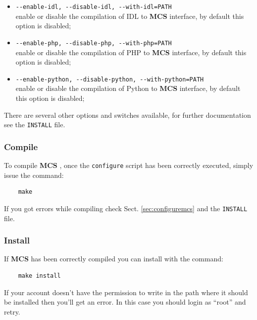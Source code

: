 \documentclass[12pt,titlepage]{article}
\newcommand{\mcs}{\textbf{MCS} }
\newcommand{\myro}{\textbf{MyRO} }
\newcommand{\dif}{\textbf{DIF} }
\begin{document}
\begin{itemize}
\item \verb|--enable-idl, --disable-idl, --with-idl=PATH| \\
  enable or disable the compilation of IDL to \mcs interface, by default
  this option is disabled;

\item \verb|--enable-php, --disable-php, --with-php=PATH| \\
  enable or disable the compilation of PHP to \mcs interface, by default
  this option is disabled;

\item \verb|--enable-python, --disable-python, --with-python=PATH| \\
  enable or disable the compilation of Python to \mcs interface, by default
  this option is disabled;
\end{itemize}

\bigskip

%

\noindent
There are several other options and switches available, for further
documentation see the \verb|INSTALL| file.

%
\subsubsection{Compile}
\label{sec:compilemcs}
To compile \mcs, once the \verb|configure| script has been correctly
executed, simply issue the command:
%
\begin{verbatim}
    make
\end{verbatim}
%
If you got errors while compiling check Sect. \ref{sec:configuremcs}
and the \verb|INSTALL| file.

%
\subsubsection{Install}
\label{sec:installmcs}
If \mcs has been correctly compiled you can install with the command:
%
\begin{verbatim}
    make install
\end{verbatim}
%
If your account doesn't have the permission to write in the
path where it should be installed then you'll get an error. In this case you
should login as ``root'' and retry.
\end{document}
